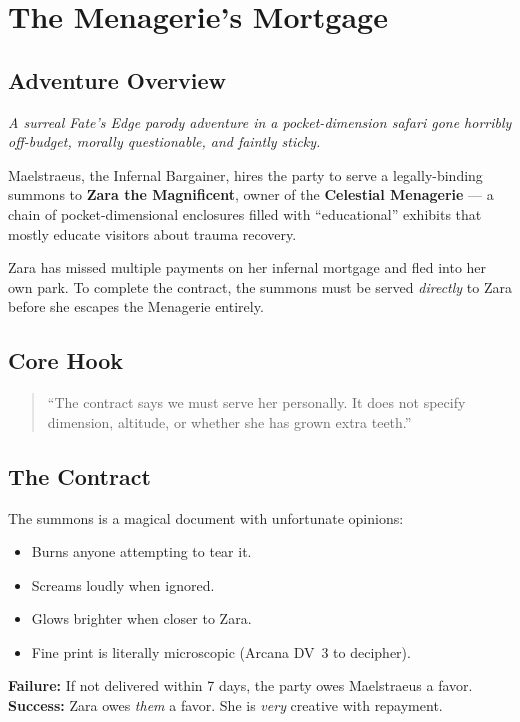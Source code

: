 \chapter{The Menagerie's Mortgage}
\label{chap:menagerie-mortgage}

\section*{Adventure Overview}
\textit{A surreal Fate's Edge parody adventure in a pocket-dimension safari gone horribly off-budget, morally questionable, and faintly sticky.}

Maelstraeus, the Infernal Bargainer, hires the party to serve a legally-binding summons to \textbf{Zara the Magnificent}, owner of the \textbf{Celestial Menagerie} --- a chain of pocket-dimensional enclosures filled with ``educational'' exhibits that mostly educate visitors about trauma recovery.

Zara has missed multiple payments on her infernal mortgage and fled into her own park. To complete the contract, the summons must be served \textit{directly} to Zara before she escapes the Menagerie entirely.

\section*{Core Hook}
\begin{quote}
``The contract says we must serve her personally. It does not specify dimension, altitude, or whether she has grown extra teeth.''
\end{quote}

\section{The Contract}
The summons is a magical document with unfortunate opinions:
\begin{itemize}
  \item Burns anyone attempting to tear it.
  \item Screams loudly when ignored.
  \item Glows brighter when closer to Zara.
  \item Fine print is literally microscopic (Arcana DV~3 to decipher).
\end{itemize}

\textbf{Failure:} If not delivered within 7 days, the party owes Maelstraeus a favor.  
\textbf{Success:} Zara owes \textit{them} a favor. She is \textit{very} creative with repayment.

